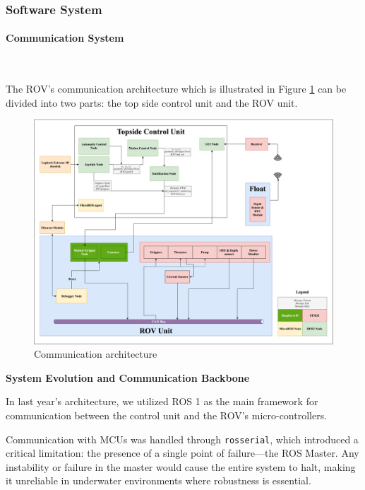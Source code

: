 \subsubsection{Software System}

\paragraph{Communication System} \ \\
\vspace{-0.5cm}

The ROV's communication architecture which is illustrated in Figure \ref{fig:rov_architecture} can be divided into two parts: the top side control unit and the ROV unit.

\begin{figure}[h!]
    \centering
    \includegraphics[width=\columnwidth]{Sections/2Design Rationale/images/rov_architecture_2.png}
    \caption{Communication architecture}
    \label{fig:rov_architecture}
\end{figure}

\vspace{0.2cm}
\textbf{System Evolution and Communication Backbone}

In last year's architecture, we utilized ROS 1 as the main framework for communication between the control unit and the ROV's micro-controllers. 

\hspace{10pt} Communication with MCUs was handled through \texttt{rosserial}, which introduced a critical limitation: the presence of a single point of failure—the ROS Master. Any instability or failure in the master would cause the entire system to halt, making it unreliable in underwater environments where robustness is essential.

